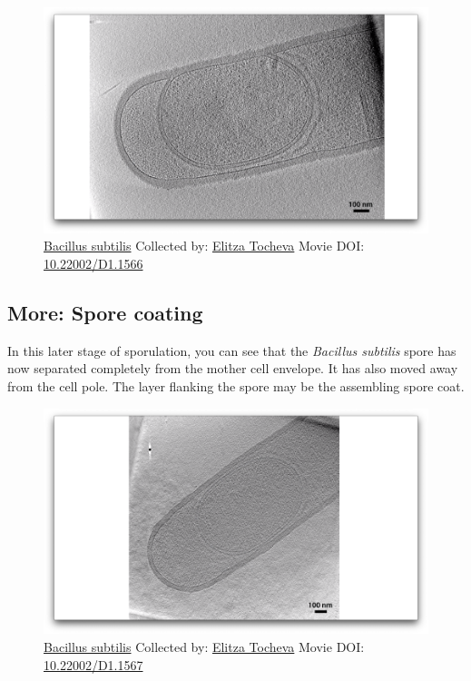 \documentclass[]{tufte-book}
\begin{document}
\begin{figure}
\includegraphics{movie_stills/8_6a} \caption[\protect\hyperlink{tree}{Bacillus subtilis} Collected by:
\protect\hyperlink{elitza_tocheva}{Elitza Tocheva} Movie DOI:
\href{https://doi.org/10.22002/D1.1566}{10.22002/D1.1566}]{\protect\hyperlink{tree}{Bacillus subtilis} Collected by:
\protect\hyperlink{elitza_tocheva}{Elitza Tocheva} Movie DOI:
\href{https://doi.org/10.22002/D1.1566}{10.22002/D1.1566}}\label{fig:8-6a}
\end{figure}

\hypertarget{Spore_coating}{\subsection*{More: Spore
coating}\label{Spore_coating}}

In this later stage of sporulation, you can see that the \emph{Bacillus
subtilis} spore has now separated completely from the mother cell
envelope. It has also moved away from the cell pole. The layer flanking
the spore may be the assembling spore coat.





\begin{figure}
\includegraphics{movie_stills/8_6b} \caption[\protect\hyperlink{tree}{Bacillus subtilis} Collected by:
\protect\hyperlink{elitza_tocheva}{Elitza Tocheva} Movie DOI:
\href{https://doi.org/10.22002/D1.1567}{10.22002/D1.1567}]{\protect\hyperlink{tree}{Bacillus subtilis} Collected by:
\protect\hyperlink{elitza_tocheva}{Elitza Tocheva} Movie DOI:
\href{https://doi.org/10.22002/D1.1567}{10.22002/D1.1567}}\label{fig:8-6b}
\end{figure}
\end{document}
